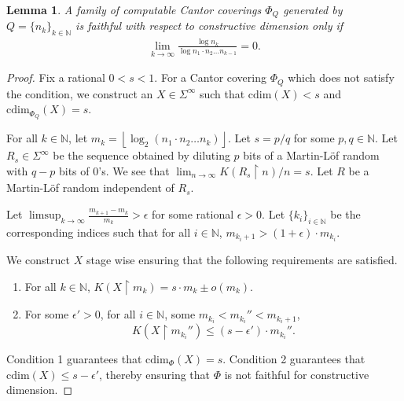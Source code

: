 \documentclass[11pt]{article}
\newtheorem{lemma}{Lemma}
\newcommand{\floor}[1]{ \left\lfloor #1 \right\rfloor }
\newcommand{\restr}{\upharpoonright}
\newcommand{\N}{\mathbb{N}}
\newcommand{\cdim}{\mathrm{cdim}}
\begin{document}
\begin{lemma} \label{thm:EffFaithCondn2}
	A family of computable Cantor coverings $\Phi_Q$ generated by $Q =
	\{n_k\}_{k \in \N}$ is faithful with respect to constructive
	dimension only if  	
	\begin{align*}
		\lim_{k\rightarrow \infty} \frac{\log n_k}{\log n_1 \cdot n_2
			\dots n_{k-1}} = 0.
	\end{align*}
\end{lemma}
\begin{proof}
	
	
	
	Fix a rational $0 < s < 1$. For a Cantor covering $\Phi_Q$ which does not satisfy the condition, we construct an $X \in \Sigma^\infty$ such that $\cdim(X) < s$ and $\cdim_{\Phi_Q}(X) = s$. 
	
	
	 For all $k \in \N$, let $m_k = \floor{\log_2(n_1 \cdot n_2 \dots
		n_k)}.$ Let $s = p/q$ for some $p,q \in \N$. Let $R_s \in \Sigma^\infty$ be the sequence obtained by diluting $p$ bits of a Martin-L\"of random with $q-p$ bits of $0$'s. We see that $\lim_{n\to \infty} K(R_s \restr n)/n = s$. Let $R$ be a Martin-L\"of random independent of $R_s$.
	
	Let $\limsup_{k\rightarrow \infty} \frac{ m_{k+1} - m_{k}}{m_k} > \epsilon $ for some rational $\epsilon > 0$. Let $\{k_i\}_{i \in \N}$ be the corresponding indices such that for all $i \in \N$, ${ m_{k_i+1}} > (1 + \epsilon) \cdot {m_{k_i}}$. 
	

	
	
	
	We construct $X$ stage wise ensuring that the following requirements are satisfied. 
	
	\begin{enumerate}
		\item For all $k \in \N$, $K(X\restr m_{k}) = s \cdot m_{k} \pm o(m_k).$
		\item For some $\epsilon'>0$, for all $i \in \N$, 
		some $m_{k_i} < m_{k_i}'' < m_{{k_i}+1}$, $$K(X \restr m_{k_i}'') \leq (s - \epsilon') \cdot m_{k_i}''.$$
	\end{enumerate}
	
	Condition 1 guarantees that $\cdim_{\Phi}(X) = s$. Condition 2 guarantees that $\cdim(X) \leq s - \epsilon'$, thereby ensuring that $\Phi$ is not faithful for constructive dimension. 
	

\end{proof}
\end{document}
